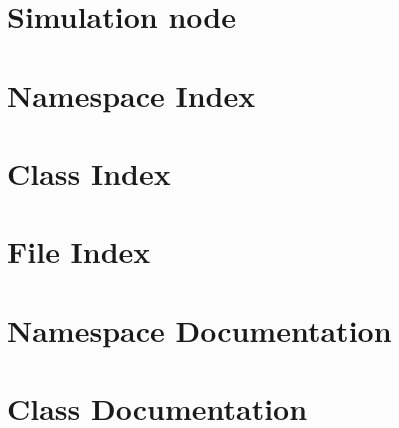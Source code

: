 \let\mypdfximage\pdfximage\def\pdfximage{\immediate\mypdfximage}\documentclass[twoside]{book}
\newcommand{\+}{\discretionary{\mbox{\scriptsize$\hookleftarrow$}}{}{}}
\begin{document}
\chapter{Simulation node}
\label{md_V-rep_readme}

\chapter{Namespace Index}

\chapter{Class Index}

\chapter{File Index}

\chapter{Namespace Documentation}





















\chapter{Class Documentation}



\end{document}
